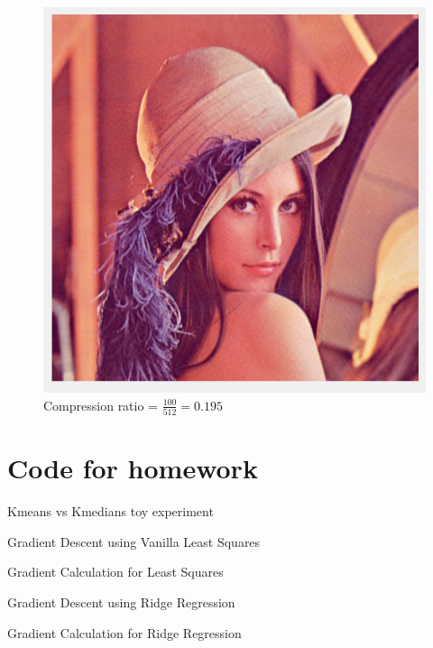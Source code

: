 \documentclass[11pt]{article}
\begin{document}
\begin{figure}[!h]
\centering
	\caption{Compression ratio = $\frac{100}{512} = 0.195$}
	\includegraphics[scale=.6]{lenna_100}
\end{figure}

\section*{Code for homework}
Kmeans vs Kmedians toy experiment

Gradient Descent using Vanilla Least Squares

Gradient Calculation for Least Squares

Gradient Descent using Ridge Regression

Gradient Calculation for Ridge Regression

\end{document}
